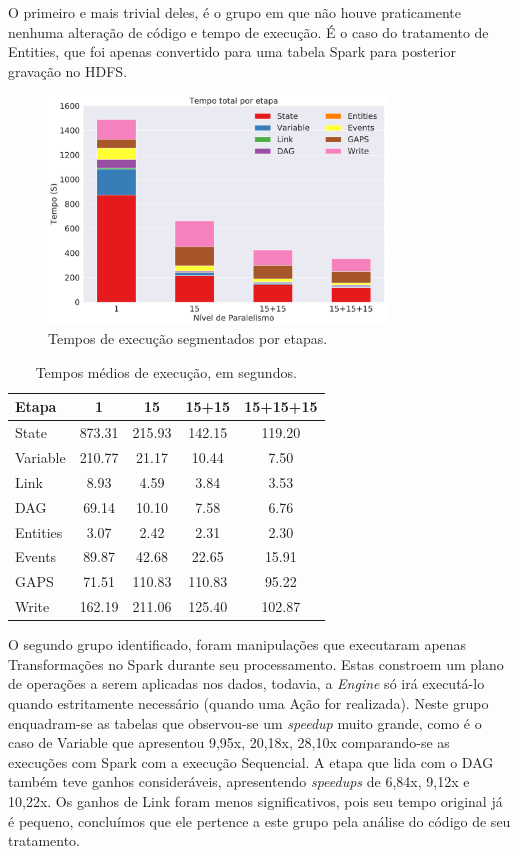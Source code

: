 O primeiro e mais trivial deles, é o grupo em que não houve praticamente 
nenhuma alteração de código e tempo de execução. É o caso do tratamento de 
Entities, que foi apenas convertido para uma tabela Spark para posterior 
gravação no HDFS.

\begin{figure}[H]
\centerline{
\includegraphics[width=0.8\textwidth]{./img/total_step.pdf}}
 \caption{Tempos de execução segmentados por etapas.}
 \label{fig:total_step}
\end{figure}


\begin{table}[ht]
\centering
\small
\begin{tabular}{l c c c c} \toprule
\textbf{Etapa}  & \textbf{1} & \textbf{15} & \textbf{15+15} & 
\textbf{15+15+15}\\ 
\midrule
State		& 873.31 & 215.93 & 142.15 & 119.20\\
Variable  	& 210.77 & 21.17  & 10.44  & 7.50 \\
Link      	& 8.93   & 4.59   & 3.84   & 3.53 \\
DAG        	& 69.14  & 10.10  & 7.58   & 6.76 \\
Entities	& 3.07   & 2.42   & 2.31   & 2.30 \\
Events		& 89.87  & 42.68  & 22.65  & 15.91\\
GAPS		& 71.51  & 110.83 & 110.83 & 95.22\\
Write		& 162.19 & 211.06 & 125.40 & 102.87\\
\end{tabular}
\caption{Tempos médios de execução, em segundos.}
\label{tab:total_step}
\end{table}

O segundo grupo identificado, foram manipulações que executaram apenas 
Transformações no Spark \cite{ref:sparkbook} durante seu processamento. Estas 
constroem um plano de operações a serem aplicadas nos dados, todavia, a 
\emph{Engine} só irá executá-lo quando estritamente necessário (quando uma Ação 
for realizada). Neste grupo enquadram-se as tabelas que observou-se um 
\emph{speedup} muito grande, como é o caso de Variable que apresentou 9,95x, 
20,18x, 28,10x comparando-se as execuções com Spark com a execução Sequencial. A 
etapa que lida com o DAG também teve ganhos consideráveis, apresentendo 
\emph{speedups} de 6,84x, 9,12x e 10,22x. Os ganhos de Link foram menos 
significativos, pois seu tempo original já é pequeno, concluímos que ele 
pertence a este grupo pela análise do código de seu tratamento.

